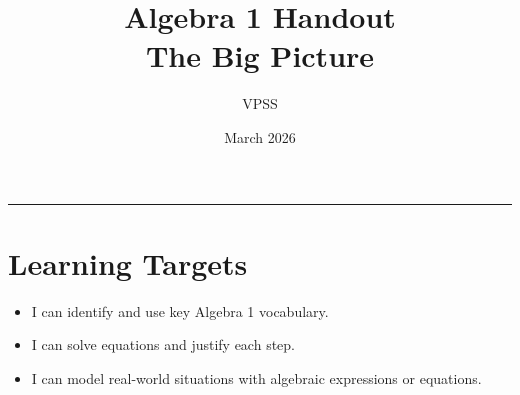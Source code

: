 \documentclass[11pt]{article}
\begin{document}
\title{\textbf{Algebra 1 Handout \\ \small The Big Picture}}
\author{VPSS}
\date{March 2026}

\maketitle
\hrule
\vspace{0.8em}




\section*{Learning Targets}

\begin{itemize}[leftmargin=1.4em]
\item I can identify and use key Algebra 1 vocabulary.
\item I can solve equations and justify each step.
\item I can model real-world situations with algebraic expressions or equations.
\end{itemize}


\end{document}
